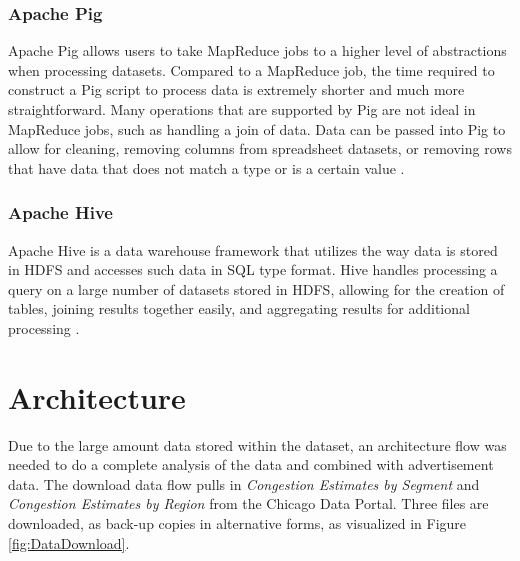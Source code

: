 \documentclass[titlepage,twocolumn]{article}
\newcommand{\HadoopEcosystem}{Hadoop Ecosystem}
\begin{document}
\subsubsection{Apache Pig}

Apache Pig allows users to take MapReduce jobs to a higher level of abstractions when processing datasets. Compared to a MapReduce job, the time required to construct a Pig script to process data is extremely shorter and much more straightforward. Many operations that are supported by Pig are not ideal in MapReduce jobs, such as handling a join of data. Data can be passed into Pig to allow for cleaning, removing columns from spreadsheet datasets, or removing rows that have data that does not match a type or is a certain value \cite{white_2015:Ch16}. 

\subsubsection{Apache Hive}

Apache Hive is a data warehouse framework that utilizes the way data is stored in HDFS and accesses such data in SQL type format. Hive handles processing a query on a large number of datasets stored in HDFS, allowing for the creation of tables, joining results together easily, and aggregating results for additional processing \cite{white_2015:Ch17}. 


\section{Architecture}


\par Due to the large amount data stored within the dataset, an architecture flow was needed to do a complete analysis of the data and combined with advertisement data. The download data flow pulls in \textit{Congestion Estimates by Segment} and \textit{Congestion Estimates by Region} from the Chicago Data Portal. Three files are downloaded, as back-up copies in alternative forms, as visualized in Figure \ref{fig:DataDownload}. 
\end{document}
